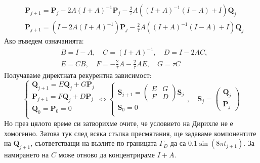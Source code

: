 \documentclass[12pt]{article}
\begin{document}
\begin{large}
\begin{align*}
&\mathbf{P}_{j + 1} = \mathbf{P}_j -2 A \left(I + A \right)^{-1} \mathbf{P}_j - \frac{2}{\tau} A \left(\left(I + A \right)^{-1} \left(I - A \right) + I \right) \mathbf{Q}_j \\
&\mathbf{P}_{j + 1} = \left(I -2 A \left(I + A \right)^{-1}\right) \mathbf{P}_j - \frac{2}{\tau} A \left(\left(I + A \right)^{-1} \left(I - A \right) + I \right) \mathbf{Q}_j
\end{align*}
Ако въведем означанията:
\begin{align*}
&B = I - A, \quad C = (I + A)^{-1}, \quad D = I - 2 A C, \\
&E = C B, \quad F = -\frac{2}{\tau} A - \frac{2}{\tau} A E, \quad G = \tau C  
\end{align*}
Получаваме директната рекурентна зависимост:
\begin{equation}
	\begin{cases}
      \mathbf{Q}_{j + 1} = E\mathbf{Q}_j + G\mathbf{P}_j \\
      \mathbf{P}_{j + 1} = F\mathbf{Q}_j + D\mathbf{P}_j \\
      \mathbf{Q}_0 = \mathbf{P}_0 = 0 \\
    \end{cases}
    \iff
    \begin{cases}
      \mathbf{S}_{j + 1} = 
      	\left(\begin{array}{c|c}
			E & G \\ \hline
			F & D 
		\end{array}\right) \mathbf{S}_j \\
      \mathbf{S}_0 = 0 \\
    \end{cases}, \quad 
    \mathbf{S}_j = 
    	\left(\begin{array}{c}
			\mathbf{Q}_j \\ \hline
			\mathbf{P}_j
		\end{array}\right)
\end{equation}
Но през цялото време си затворихме очите, че условието на Дирихле не е хомогенно. Затова тук след всяка стъпка пресмятания, ще задаваме компонентите на $\mathbf{Q}_{j + 1}$, съответстващи на възлите по границата $\Gamma_{D}$ да са $0.1\sin(8\pi t_{j+1})$. За намирането на $C$ може отново да концентрираме $I + A$.
\end{large}
\end{document}

